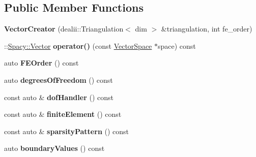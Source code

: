 \subsection*{\-Public \-Member \-Functions}
\begin{DoxyCompactItemize}
\item 
\hypertarget{classSpacy_1_1dealII_1_1VectorCreator_a5afc306745f86ae52ad33a5c83884935}{{\bfseries \-Vector\-Creator} (dealii\-::\-Triangulation$<$ dim $>$ \&triangulation, int fe\-\_\-order)}\label{classSpacy_1_1dealII_1_1VectorCreator_a5afc306745f86ae52ad33a5c83884935}

\item 
\hypertarget{classSpacy_1_1dealII_1_1VectorCreator_ab4ae05c4dd528e1f4d45231e32021437}{\-::\hyperlink{classSpacy_1_1Vector}{\-Spacy\-::\-Vector} {\bfseries operator()} (const \hyperlink{classSpacy_1_1VectorSpace}{\-Vector\-Space} $\ast$space) const }\label{classSpacy_1_1dealII_1_1VectorCreator_ab4ae05c4dd528e1f4d45231e32021437}

\item 
\hypertarget{classSpacy_1_1dealII_1_1VectorCreator_a61e5fe6c73cefe05d16140608542cbaa}{auto {\bfseries \-F\-E\-Order} () const }\label{classSpacy_1_1dealII_1_1VectorCreator_a61e5fe6c73cefe05d16140608542cbaa}

\item 
\hypertarget{classSpacy_1_1dealII_1_1VectorCreator_affb824748540374f0fbfa4d3467d1255}{auto {\bfseries degrees\-Of\-Freedom} () const }\label{classSpacy_1_1dealII_1_1VectorCreator_affb824748540374f0fbfa4d3467d1255}

\item 
\hypertarget{classSpacy_1_1dealII_1_1VectorCreator_ae048100414798458ac093953de6475ac}{const auto \& {\bfseries dof\-Handler} () const }\label{classSpacy_1_1dealII_1_1VectorCreator_ae048100414798458ac093953de6475ac}

\item 
\hypertarget{classSpacy_1_1dealII_1_1VectorCreator_a48104b12fa317e7a29fd531cca8a8b4f}{const auto \& {\bfseries finite\-Element} () const }\label{classSpacy_1_1dealII_1_1VectorCreator_a48104b12fa317e7a29fd531cca8a8b4f}

\item 
\hypertarget{classSpacy_1_1dealII_1_1VectorCreator_a08c118dd385713f3c58175947a9ac7b3}{const auto \& {\bfseries sparsity\-Pattern} () const }\label{classSpacy_1_1dealII_1_1VectorCreator_a08c118dd385713f3c58175947a9ac7b3}

\item 
\hypertarget{classSpacy_1_1dealII_1_1VectorCreator_a1078e3e0d565a937f85c8f0b553f7861}{auto {\bfseries boundary\-Values} () const }\label{classSpacy_1_1dealII_1_1VectorCreator_a1078e3e0d565a937f85c8f0b553f7861}

\end{DoxyCompactItemize}


